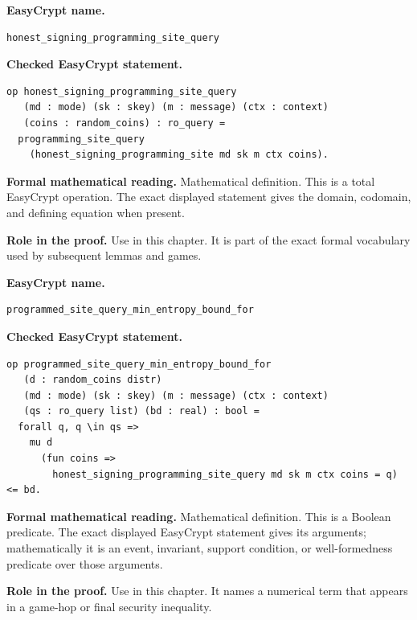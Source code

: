 \begin{formaldefinition}
\noindent\textbf{EasyCrypt name.}
\begin{lstlisting}[language=EasyCrypt,basicstyle=\ttfamily\scriptsize]
honest_signing_programming_site_query
\end{lstlisting}
\noindent\textbf{Checked EasyCrypt statement.}
\begin{lstlisting}[language=EasyCrypt,basicstyle=\ttfamily\scriptsize]
op honest_signing_programming_site_query
   (md : mode) (sk : skey) (m : message) (ctx : context)
   (coins : random_coins) : ro_query =
  programming_site_query
    (honest_signing_programming_site md sk m ctx coins).
\end{lstlisting}
\noindent\textbf{Formal mathematical reading.}
Mathematical definition. This is a total EasyCrypt operation.  The exact displayed statement gives the domain, codomain, and defining equation when present.

\noindent\textbf{Role in the proof.}
Use in this chapter. It is part of the exact formal vocabulary used by subsequent lemmas and games.

\end{formaldefinition}

\begin{formaldefinition}
\noindent\textbf{EasyCrypt name.}
\begin{lstlisting}[language=EasyCrypt,basicstyle=\ttfamily\scriptsize]
programmed_site_query_min_entropy_bound_for
\end{lstlisting}
\noindent\textbf{Checked EasyCrypt statement.}
\begin{lstlisting}[language=EasyCrypt,basicstyle=\ttfamily\scriptsize]
op programmed_site_query_min_entropy_bound_for
   (d : random_coins distr)
   (md : mode) (sk : skey) (m : message) (ctx : context)
   (qs : ro_query list) (bd : real) : bool =
  forall q, q \in qs =>
    mu d
      (fun coins =>
        honest_signing_programming_site_query md sk m ctx coins = q) <= bd.
\end{lstlisting}
\noindent\textbf{Formal mathematical reading.}
Mathematical definition. This is a Boolean predicate.  The exact displayed EasyCrypt statement gives its arguments; mathematically it is an event, invariant, support condition, or well-formedness predicate over those arguments.

\noindent\textbf{Role in the proof.}
Use in this chapter. It names a numerical term that appears in a game-hop or final security inequality.

\end{formaldefinition}

